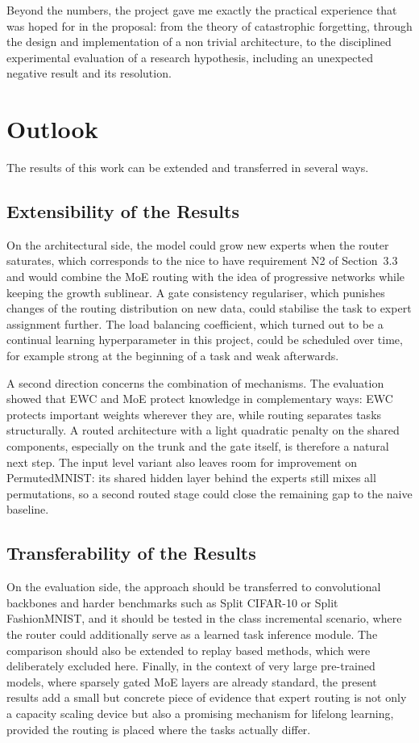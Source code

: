 Beyond the numbers, the project gave me exactly the practical experience
that was hoped for in the proposal: from the theory of catastrophic
forgetting, through the design and implementation of a non trivial
architecture, to the disciplined experimental evaluation of a research
hypothesis, including an unexpected negative result and its resolution.

\section{Outlook}
\label{sec:outlook}

The results of this work can be extended and transferred in several ways.

\subsection{Extensibility of the Results}

On the architectural side, the model could grow new experts when the router
saturates, which corresponds to the nice to have requirement N2 of
Section~3.3 and would combine the MoE routing with the idea of progressive
networks while keeping the growth sublinear. A gate consistency
regulariser, which punishes changes of the routing distribution on new
data, could stabilise the task to expert assignment further. The load
balancing coefficient, which turned out to be a continual learning
hyperparameter in this project, could be scheduled over time, for example
strong at the beginning of a task and weak afterwards.

A second direction concerns the combination of mechanisms. The evaluation
showed that EWC and MoE protect knowledge in complementary ways: EWC
protects important weights wherever they are, while routing separates
tasks structurally. A routed architecture with a light quadratic penalty
on the shared components, especially on the trunk and the gate itself, is
therefore a natural next step. The input level variant also leaves room
for improvement on PermutedMNIST: its shared hidden layer behind the
experts still mixes all permutations, so a second routed stage could close
the remaining gap to the naive baseline.

\subsection{Transferability of the Results}

On the evaluation side, the approach should be transferred to convolutional
backbones and harder benchmarks such as Split CIFAR-10 or Split
FashionMNIST, and it should be tested in the class incremental scenario,
where the router could additionally serve as a learned task inference
module. The comparison should also be extended to replay based methods,
which were deliberately excluded here. Finally, in the context of very
large pre-trained models, where sparsely gated MoE layers are already
standard, the present results add a small but concrete piece of evidence
that expert routing is not only a capacity scaling device but also a
promising mechanism for lifelong learning, provided the routing is placed
where the tasks actually differ.

